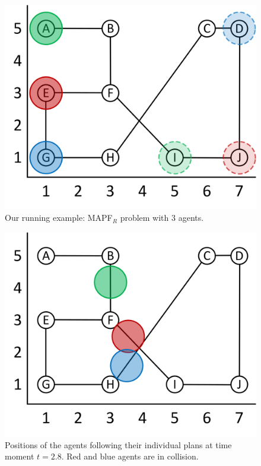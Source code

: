 \documentclass[review]{elsarticle}
\newcommand{\target}{\ensuremath{G}\xspace}
\newcommand{\source}{\ensuremath{S}\xspace}
\newcommand\konstantin[1]{\nb{\textbf{Konstantin:}}{red}{#1}}
\newcommand{\mapfr}{\ac{MAPF}$_R$\xspace}
\newcommand{\coord}{\textit{coord}\xspace}
\begin{document}




\begin{figure}
    \centering
    \includegraphics[width=0.6\columnwidth]{running_example.png}
    \caption{Our running example: \mapfr problem with 3 agents.}
    \label{fig:example}
\end{figure}

\begin{figure}
    \centering
    \includegraphics[width=0.6\columnwidth]{running_example_t2-8.png}
    \caption{Positions of the agents following their individual plans at time moment $t=2.8$. Red and blue agents are in collision.}
    \label{fig:example-t-2-8}
\end{figure}
\end{document}
